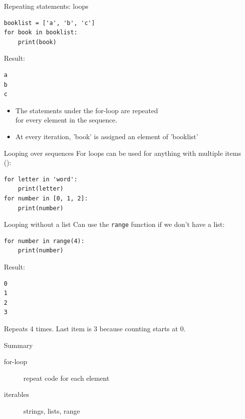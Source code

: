 \documentclass[aspectratio=169,usenames,dvipsnames]{beamer}
\begin{document}
\begin{frame}[fragile]{Repeating statements: loops}
\begin{lstlisting}
booklist = ['a', 'b', 'c']
for book in booklist:
    print(book)
\end{lstlisting}
Result:
\begin{lstlisting}
a
b
c
\end{lstlisting}

\begin{itemize}
\item The statements under the for-loop are repeated \\
    for every element in the sequence.
\item At every iteration, 'book' is assigned an element of 'booklist'
\end{itemize}
\end{frame}

\begin{frame}[fragile]{Looping over sequences}
For loops can be used for anything with multiple items ():
\begin{lstlisting}
for letter in 'word':
    print(letter)
for number in [0, 1, 2]:
    print(number)
\end{lstlisting}
\end{frame}



\begin{frame}[fragile]{Looping without a list}
Can use the \texttt{range} function if we don't have a list:
\begin{lstlisting}
for number in range(4):
    print(number)
\end{lstlisting}

Result:
\begin{lstlisting}
0
1
2
3
\end{lstlisting}

Repeats 4 times. Last item is 3 because counting starts at 0.
\end{frame}

\begin{frame}{Summary}
    \begin{description}
        \item[for-loop] repeat code for each element
        \item[iterables] strings, lists, range
    \end{description}
\end{frame}
\end{document}

